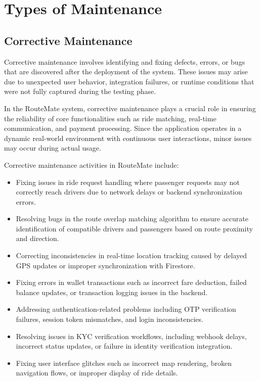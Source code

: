 \documentclass[10pt,a4paper]{report}
\begin{document}
\section{Types of Maintenance}

\subsection{Corrective Maintenance}

\justify\large Corrective maintenance involves identifying and fixing defects, errors, or bugs that are discovered after the deployment of the system. These issues may arise due to unexpected user behavior, integration failures, or runtime conditions that were not fully captured during the testing phase.

\justify\large In the RouteMate system, corrective maintenance plays a crucial role in ensuring the reliability of core functionalities such as ride matching, real-time communication, and payment processing. Since the application operates in a dynamic real-world environment with continuous user interactions, minor issues may occur during actual usage.

\justify\large Corrective maintenance activities in RouteMate include:

\begin{itemize}

\item Fixing issues in ride request handling where passenger requests may not correctly reach drivers due to network delays or backend synchronization errors.

\item Resolving bugs in the route overlap matching algorithm to ensure accurate identification of compatible drivers and passengers based on route proximity and direction.

\item Correcting inconsistencies in real-time location tracking caused by delayed GPS updates or improper synchronization with Firestore.

\item Fixing errors in wallet transactions such as incorrect fare deduction, failed balance updates, or transaction logging issues in the backend.

\item Addressing authentication-related problems including OTP verification failures, session token mismatches, and login inconsistencies.

\item Resolving issues in KYC verification workflows, including webhook delays, incorrect status updates, or failure in identity verification integration.

\item Fixing user interface glitches such as incorrect map rendering, broken navigation flows, or improper display of ride details.

\end{itemize}
\end{document}
